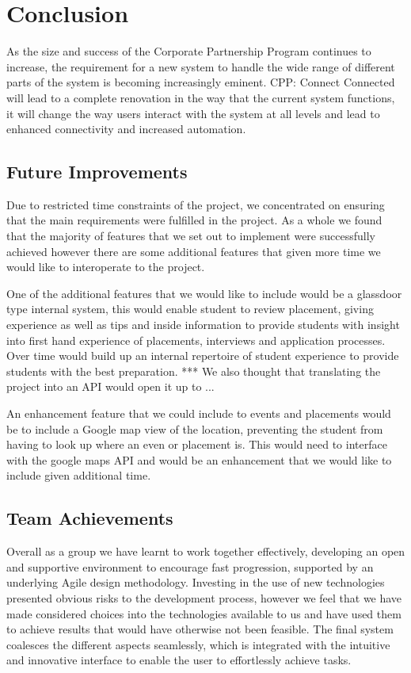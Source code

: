 \section{Conclusion}
As the size and success of the Corporate Partnership Program continues to increase, the requirement for a new system to handle the wide range of different parts of the system is becoming increasingly eminent. CPP: Connect Connected will lead to a complete renovation in the way that the current system functions, it will change the way users interact with the system at all levels and lead to enhanced connectivity and increased automation.
	
	\subsection{Future Improvements}
		Due to restricted time constraints of the project, we concentrated on ensuring that the main requirements were fulfilled in the project. As a whole we found that the majority of features that we set out to implement were successfully achieved however there are some additional features that given more time we would like to interoperate to the project.

		One of the additional features that we would like to include would be a glassdoor type internal system, this would enable student to review placement, giving experience as well as tips and inside information to provide students with insight into first hand experience of placements, interviews and application processes. Over time would build up an internal repertoire of student experience to provide students with the best preparation.
		*** We also thought that translating the project into an API would open it up to ...
		
		An enhancement feature that we could include to events and placements would be to include a Google map view of the location, preventing the student from having to look up where an even or placement is. This would need to interface with the google maps API and would be an enhancement that we would like to include given additional time.

	\subsection{Team Achievements}
		Overall as a group we have learnt to work together effectively, developing an open and supportive environment to encourage fast progression, supported by an underlying Agile design methodology.
		Investing in the use of new technologies presented obvious risks to the development process, however we feel that we have made considered choices into the technologies available to us and have used them to achieve results that would have otherwise not been feasible. The final system coalesces the different aspects seamlessly, which is integrated with the intuitive and innovative interface to enable the user to effortlessly achieve tasks.
		
